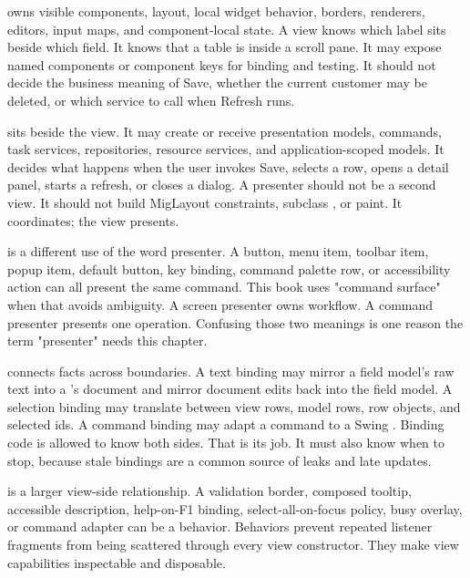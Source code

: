  owns visible components, layout, local widget behavior, borders, renderers, editors, input maps, and component-local state. A view knows which label sits beside which field. It knows that a table is inside a scroll pane. It may expose named components or component keys for binding and testing. It should not decide the business meaning of Save, whether the current customer may be deleted, or which service to call when Refresh runs.

 sits beside the view. It may create or receive presentation models, commands, task services, repositories, resource services, and application-scoped models. It decides what happens when the user invokes Save, selects a row, opens a detail panel, starts a refresh, or closes a dialog. A presenter should not be a second view. It should not build MigLayout constraints, subclass , or paint. It coordinates; the view presents.

 is a different use of the word presenter. A button, menu item, toolbar item, popup item, default button, key binding, command palette row, or accessibility action can all present the same command. This book uses "command surface" when that avoids ambiguity. A screen presenter owns workflow. A command presenter presents one operation. Confusing those two meanings is one reason the term "presenter" needs this chapter.

 connects facts across boundaries. A text binding may mirror a field model's raw text into a 's document and mirror document edits back into the field model. A selection binding may translate between  view rows, model rows, row objects, and selected ids. A command binding may adapt a command to a Swing . Binding code is allowed to know both sides. That is its job. It must also know when to stop, because stale bindings are a common source of leaks and late updates.

 is a larger view-side relationship. A validation border, composed tooltip, accessible description, help-on-F1 binding, select-all-on-focus policy, busy overlay, or command adapter can be a behavior. Behaviors prevent repeated listener fragments from being scattered through every view constructor. They make view capabilities inspectable and disposable.

